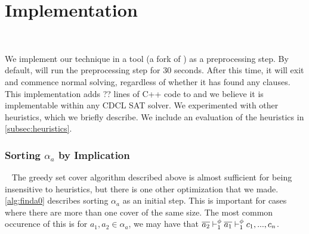 \section{Implementation}~\label{sec:implementation}

We implement our technique in a tool \tool (a fork of \cadical
) as a preprocessing step. By default, \tool will run the preprocessing step for
30 seconds. After this time, it will exit and commence normal solving,
regardless of whether it has found any \pr clauses. This implementation adds ??
lines of C++ code to \cadical and we believe it is implementable within any CDCL
SAT solver. We experimented with other heuristics, which we briefly describe. We
include an evaluation of the heuristics in \autoref{subsec:heuristics}.





\subsubsection{Sorting $\alpha_a$ by Implication}~\label{subsubsec:impordering}
The greedy set cover algorithm described above is almost sufficient for being
insensitive to heuristics, but there is one other optimization that we made.
\autoref{alg:finda0} describes sorting $\alpha_a$ as an initial step. This is
important for cases where there are more than one cover of the same size. The
most common occurence of this is for $a_1, a_2 \in \alpha_a$, we may have that
$\overline{a_2} \vdash_1^\phi \overline{a_1} \vdash_1^\phi c_1, ..., c_n$. 


